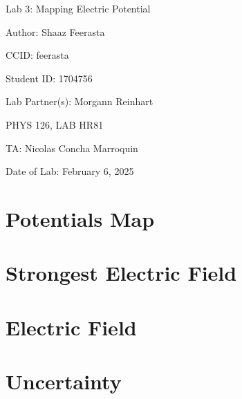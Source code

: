 \documentclass[12pt]{article}
\begin{document}
\pagebreak

\begin{titlepage}
    \begin{center}
        \vspace*{\fill}
        Lab 3: Mapping Electric Potential

        Author: Shaaz Feerasta

        CCID: feerasta

        Student ID: 1704756

        Lab Partner(s): Morgann Reinhart

        PHYS 126, LAB HR81

        TA: Nicolas Concha Marroquin

        Date of Lab: February 6, 2025
        \vspace*{\fill}
    \end{center}
\end{titlepage}

\section{Potentials Map}

\section{Strongest Electric Field}

\section{Electric Field}

\section{Uncertainty}
\end{document}
